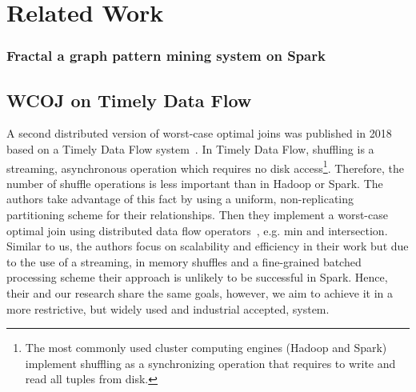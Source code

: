 \section{Related Work} \label{sec:related-work}






\subsubsection{Fractal a graph pattern mining system on Spark}

\subsection{\textsc{WCOJ} on Timely Data Flow}\label{subsec:wcoj-timely-data-flow}

A second distributed version of worst-case optimal joins was published in 2018 based on a Timely Data Flow system~\cite{ammar2018distributed,naiad}.
In Timely Data Flow, shuffling is a streaming, asynchronous operation which requires no disk access\footnote{The most commonly used cluster computing engines (Hadoop and Spark) implement shuffling as a synchronizing operation that requires to write and read all tuples from disk.}.
Therefore, the number of shuffle operations is less important than in Hadoop or Spark.
The authors take advantage of this fact by using a uniform, non-replicating partitioning scheme for their relationships.
Then they implement a worst-case optimal join using distributed data flow operators~\cite{naiad}, e.g. min and intersection.
Similar to us, the authors focus on scalability and efficiency in their work but due to the use of a streaming, in memory shuffles and a fine-grained batched processing scheme their approach is unlikely to be successful in Spark.
Hence, their and our research share the same goals, however, we aim to achieve it in a more restrictive, but widely used and industrial accepted, system.

